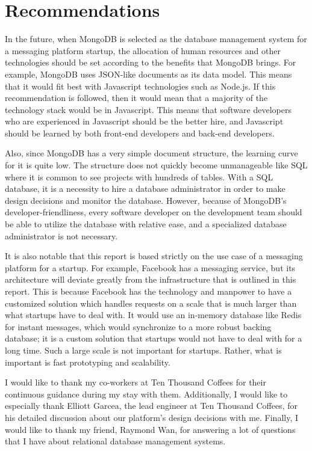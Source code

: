 \documentclass[12pt]{article}
\begin{document}
\section{Recommendations}

In the future, when MongoDB is selected as the database management system for a messaging platform startup, the allocation of human resources and other technologies should be set according to the benefits that MongoDB brings. For example, MongoDB uses JSON-like documents as its data model. This means that it would fit best with Javascript technologies such as Node.js. If this recommendation is followed, then it would mean that a majority of the technology stack would be in Javascript. This means that software developers who are experienced in Javascript should be the better hire, and Javascript should be learned by both front-end developers and back-end developers. 

Also, since MongoDB has a very simple document structure, the learning curve for it is quite low. The structure does not quickly become unmanageable like SQL where it is common to see projects with hundreds of tables. With a SQL database, it is a necessity to hire a database administrator in order to make design decisions and monitor the database. However, because of MongoDB's developer-friendliness, every software developer on the development team should be able to utilize the database with relative ease, and a specialized database administrator is not necessary. 

It is also notable that this report is based strictly on the use case of a messaging platform for a startup. For example, Facebook has a messaging service, but its architecture will deviate greatly from the infrastructure that is outlined in this report. This is because Facebook has the technology and manpower to have a customized solution which handles requests on a scale that is much larger than what startups have to deal with. It would use an in-memory database like Redis for instant messages, which would synchronize to a more robust backing database; it is a custom solution that startups would not have to deal with for a long time. Such a large scale is not important for startups. Rather, what is important is fast prototyping and scalability.

\newpage



\newpage


I would like to thank my co-workers at Ten Thousand Coffees for their continuous guidance during my stay with them. Additionally, I would like to especially thank Elliott Garcea, the lead engineer at Ten Thousand Coffees, for his detailed discussion about our platform's design decisions with me. Finally, I would like to thank my friend, Raymond Wan, for answering a lot of questions that I have about relational database management systems.
\newpage
\end{document}

